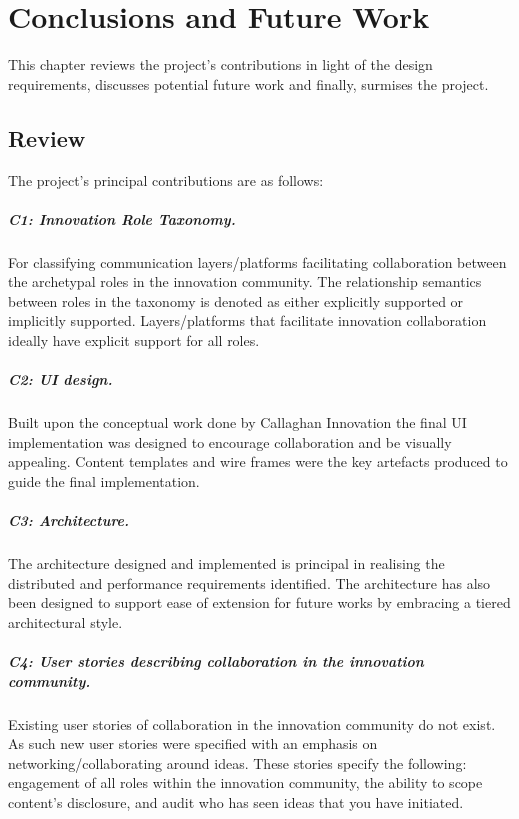 \chapter{Conclusions and Future Work}
This chapter reviews the project's contributions in light of the design requirements, discusses potential future work and finally, surmises the project.

\section{Review}

The project's principal contributions are as follows:

\paragraph{C1: Innovation Role Taxonomy.} For classifying communication layers/platforms facilitating collaboration between the archetypal roles in the innovation community. The relationship semantics between roles in the taxonomy is denoted as either explicitly supported or implicitly supported. Layers/platforms that facilitate innovation collaboration ideally have explicit support for all roles.

\paragraph{C2: UI design.} Built upon the conceptual work done by Callaghan Innovation the final UI implementation was designed to encourage collaboration and be visually appealing. Content templates and wire frames were the key artefacts produced to guide the final implementation.

\paragraph{C3: Architecture.} The architecture designed and implemented is principal in realising the distributed and performance requirements identified. The architecture has also been designed to support ease of extension for future works by embracing a tiered architectural style.

\paragraph{C4: User stories describing collaboration in the innovation community.} 

Existing user stories of collaboration in the innovation community do not exist. As such new user stories were specified with an emphasis on networking/collaborating around ideas. These stories specify the following: engagement of all roles within the innovation community, the ability to scope content's disclosure, and audit who has seen ideas that you have initiated.

